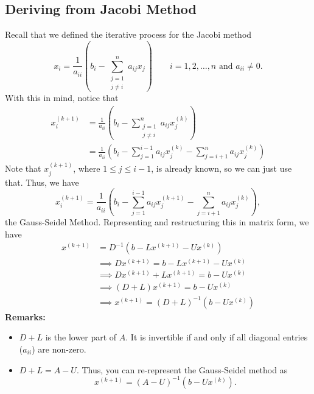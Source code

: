 \documentclass[letterpaper]{article}
\newcommand{\0}{\mathbf{0}}
\begin{document}
\subsection{Deriving from Jacobi Method}
Recall that we defined the iterative process for the Jacobi method 
\[x_i = \frac{1}{a_{ii}}\left(b_{i} - \sum_{\substack{j = 1 \\ j \neq i}}^n a_{ij}x_{j}\right) \qquad i = 1, 2, \hdots, n \text{ and } a_{ii} \neq 0.\]
With this in mind, notice that 
\begin{equation*}
    \begin{aligned}
        x_{i}^{(k + 1)} &= \frac{1}{a_{ii}} \left(b_{i} - \sum_{\substack{j = 1 \\ j \neq i}}^{n} a_{ij} x_{j}^{(k)}\right) \\ 
            &= \frac{1}{a_{ii}} \left(b_{i} - \sum_{j = 1}^{i - 1} a_{ij} x_{j}^{(k)} - \sum_{j = i + 1}^{n} a_{ij}x_{j}^{(k)}\right)
    \end{aligned}
\end{equation*}
Note that $x_{j}^{(k + 1)}$, where $1 \leq j \leq i - 1$, is already known, so we can just use that. Thus, we have  
\[\boxed{x_{i}^{(k + 1)} = \frac{1}{a_{ii}} \left(b_{i} - \sum_{j = 1}^{i - 1} a_{ij} x_{j}^{(k + 1)} - \sum_{j = i + 1}^{n} a_{ij}x_{j}^{(k)}\right)},\]
the Gauss-Seidel Method. Representing and restructuring this in matrix form, we have 
\begin{equation*}
    \begin{aligned}
        x^{(k + 1)} &= D^{-1} (b - Lx^{(k + 1)} - Ux^{(k)}) \\ 
            &\implies D x^{(k + 1)} = b - Lx^{(k + 1)} - Ux^{(k)} \\ 
            &\implies D x^{(k + 1)} + Lx^{(k + 1)} = b - Ux^{(k)} \\ 
            &\implies (D + L)x^{(k + 1)} = b - Ux^{(k)} \\ 
            &\implies \boxed{x^{(k + 1)} = (D + L)^{-1} (b - Ux^{(k)})}
    \end{aligned}
\end{equation*}
\textbf{Remarks:}
\begin{itemize}
    \item $D + L$ is the lower part of $A$. It is invertible if and only if all diagonal entries ($a_{ii}$) are non-zero.
    \item $D + L = A - U$. Thus, you can re-represent the Gauss-Seidel method as 
    \[x^{(k + 1)} = (A - U)^{-1} (b - Ux^{(k)}).\]
\end{itemize} 
\end{document}
